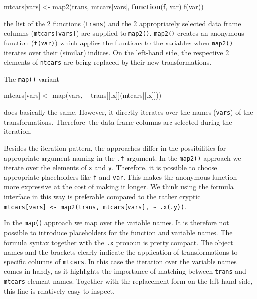 \documentclass[
]{krantz}
\makeatletter
\newenvironment{Shaded}{\begin{snugshade}}{\end{snugshade}}
\newcommand{\ControlFlowTok}[1]{\textcolor[rgb]{0.13,0.29,0.53}{\textbf{#1}}}
\newcommand{\KeywordTok}[1]{\textcolor[rgb]{0.13,0.29,0.53}{\textbf{#1}}}
\newcommand{\NormalTok}[1]{#1}
\newcommand{\OperatorTok}[1]{\textcolor[rgb]{0.81,0.36,0.00}{\textbf{#1}}}
\newcommand{\StringTok}[1]{\textcolor[rgb]{0.31,0.60,0.02}{#1}}
\newenvironment{kframe}{%
\medskip{}
\setlength{\fboxsep}{.8em}
 \def\at@end@of@kframe{}%
 \ifinner\ifhmode%
  \def\at@end@of@kframe{\end{minipage}}%
  \begin{minipage}{\columnwidth}%
 \fi\fi%
 \def\FrameCommand##1{\hskip\@totalleftmargin \hskip-\fboxsep
 \colorbox{shadecolor}{##1}\hskip-\fboxsep
     \hskip-\linewidth \hskip-\@totalleftmargin \hskip\columnwidth}%
 \MakeFramed {\advance\hsize-\width
   \@totalleftmargin\z@ \linewidth\hsize
   \@setminipage}}%
 {\par\unskip\endMakeFramed%
 \at@end@of@kframe}
\renewenvironment{Shaded}{\begin{kframe}}{\end{kframe}}
\renewcommand{\KeywordTok} [1]{\textcolor[rgb]{0.00,0.44,0.13}{{#1}}}
\renewcommand{\StringTok}  [1]{\textcolor[rgb]{0.25,0.44,0.63}{{#1}}}
\renewcommand{\NormalTok}  [1]{{#1}}
\makeatother
\begin{document}
\begin{Shaded}
\begin{Highlighting}[]
\NormalTok{mtcars[vars] <-}\StringTok{ }\KeywordTok{map2}\NormalTok{(trans, mtcars[vars], }\ControlFlowTok{function}\NormalTok{(f, var) }\KeywordTok{f}\NormalTok{(var))}
\end{Highlighting}
\end{Shaded}

the list of the 2 functions (\texttt{trans}) and the 2 appropriately selected data frame columns (\texttt{mtcars{[}vars{]}}) are supplied to \texttt{map2()}. \texttt{map2()} creates an anonymous function (\texttt{f(var)}) which applies the functions to the variables when \texttt{map2()} iterates over their (similar) indices. On the left-hand side, the respective 2 elements of \texttt{mtcars} are being replaced by their new transformations.

The \texttt{map()} variant

\begin{Shaded}
\begin{Highlighting}[]
\NormalTok{mtcars[vars] <-}\StringTok{ }\KeywordTok{map}\NormalTok{(vars, }\OperatorTok{~}\StringTok{ }\NormalTok{trans[[.x]](mtcars[[.x]]))}
\end{Highlighting}
\end{Shaded}

does basically the same. However, it directly iterates over the names (\texttt{vars}) of the transformations. Therefore, the data frame columns are selected during the iteration.

Besides the iteration pattern, the approaches differ in the possibilities for appropriate argument naming in the \texttt{.f} argument. In the \texttt{map2()} approach we iterate over the elements of \texttt{x} and \texttt{y}. Therefore, it is possible to choose appropriate placeholders like \texttt{f} and \texttt{var}. This makes the anonymous function more expressive at the cost of making it longer. We think using the formula interface in this way is preferable compared to the rather cryptic \texttt{mtcars{[}vars{]}\ \textless{}-\ map2(trans,\ mtcars{[}vars{]},\ \textasciitilde{}\ .x(.y))}.

In the \texttt{map()} approach we map over the variable names. It is therefore not possible to introduce placeholders for the function and variable names. The formula syntax together with the \texttt{.x} pronoun is pretty compact. The object names and the brackets clearly indicate the application of transformations to specific columns of \texttt{mtcars}. In this case the iteration over the variable names comes in handy, as it highlights the importance of matching between \texttt{trans} and \texttt{mtcars} element names. Together with the replacement form on the left-hand side, this line is relatively easy to inspect.
\end{document}
